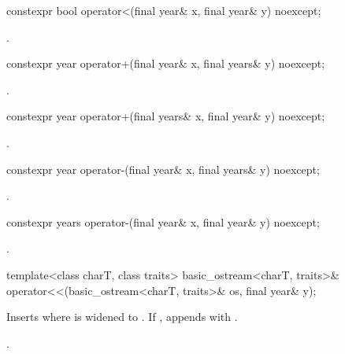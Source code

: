 %
\begin{itemdecl}
constexpr bool operator<(final year& x, final year& y) noexcept;
\end{itemdecl}

\begin{itemdescr}
\pnum
\returns {}.
\end{itemdescr}

%
\begin{itemdecl}
constexpr year operator+(final year& x, final years& y) noexcept;
\end{itemdecl}

\begin{itemdescr}
\pnum
\returns {}.
\end{itemdescr}

%
\begin{itemdecl}
constexpr year operator+(final years& x, final year& y) noexcept;
\end{itemdecl}

\begin{itemdescr}
\pnum
\returns {}.
\end{itemdescr}

%
\begin{itemdecl}
constexpr year operator-(final year& x, final years& y) noexcept;
\end{itemdecl}

\begin{itemdescr}
\pnum
\returns {}.
\end{itemdescr}

%
\begin{itemdecl}
constexpr years operator-(final year& x, final year& y) noexcept;
\end{itemdecl}

\begin{itemdescr}
\pnum
\returns {}.
\end{itemdescr}

%
\begin{itemdecl}
template<class charT, class traits>
  basic_ostream<charT, traits>&
    operator<<(basic_ostream<charT, traits>& os, final year& y);
\end{itemdecl}

\begin{itemdescr}
\pnum
\effects
Inserts  where  is
 widened to .
If , appends with .

\pnum
\returns {}.
\end{itemdescr}

